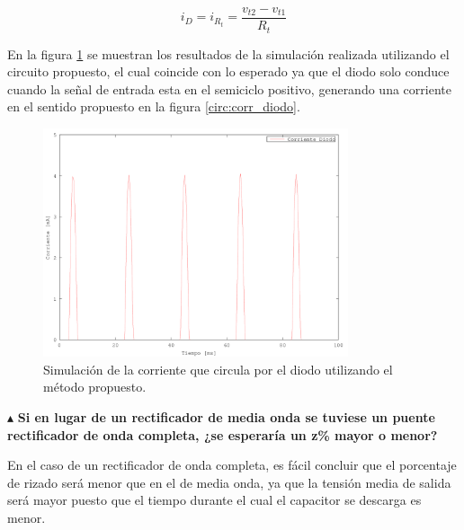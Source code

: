 \begin{equation}
i_D = i_{R_t} = \frac{v_{t2} - v_{t1}}{R_t}
\end{equation}

En la figura \ref{fig:sim_corr_diodo} se muestran los resultados de la simulación realizada utilizando el circuito propuesto, el cual coincide con lo esperado ya que el diodo solo conduce cuando la señal de entrada esta en el semiciclo positivo, generando una corriente en el sentido propuesto en la figura \ref{circ:corr_diodo}.

\begin{figure}[H]
  \centering
      \includegraphics[width=0.8\textwidth]{gfxsantiago/FIG_SIM_Rectificador_Simple_Corriente_Diodo.png}
  \caption{Simulación de la corriente que circula por el diodo utilizando el método propuesto.}
  \label{fig:sim_corr_diodo}
\end{figure}

\noindent$\blacktriangle$\textbf{ Si en lugar de un rectificador de media onda se tuviese un puente rectificador de onda completa, ¿se esperaría un z\% mayor o menor?}

En el caso de un rectificador de onda completa, es fácil concluir que el porcentaje de rizado será menor que en el de media onda, ya que la tensión media de salida será mayor puesto que el tiempo durante el cual el capacitor se descarga es menor.\\


